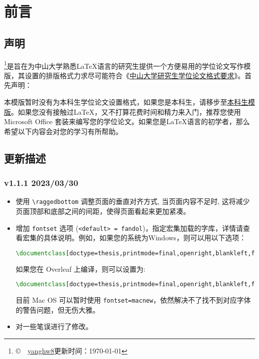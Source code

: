 \chapter{前\hspace*{1\ccwd}言}

\section{声明}

\sysuthesis{}\footnote{\copyright~\number\year~\href{https://github.com/yanghw8}{yanghw8}\hspace*{2\ccwd}更新时间：\today}是旨在为中山大学熟悉\LaTeX{}语言的研究生提供一个方便易用的学位论文写作模版，其设置的排版格式力求尽可能符合《\href{https://graduate.sysu.edu.cn/sites/graduate.prod.dpcms4.sysu.edu.cn/files/2019-04/%E4%B8%AD%E5%B1%B1%E5%A4%A7%E5%AD%A6%E7%A0%94%E7%A9%B6%E7%94%9F%E5%AD%A6%E4%BD%8D%E8%AE%BA%E6%96%87%E6%A0%BC%E5%BC%8F%E8%A6%81%E6%B1%82.pdf}{中山大学研究生学位论文格式要求}》。首先声明：

本模版暂时没有为本科生学位论文设置格式，如果您是本科生，请移步至\href{https://github.com/SYSU-SCC/sysu-thesis}{本科生模版}。如果您没有接触过\LaTeX{}，又不打算花费时间和精力来入门，推荐您使用 Microsoft Office 套装来编写您的学位论文。如果您是\LaTeX{}语言的初学者，那么希望以下内容会对您的学习有所帮助。

\section{更新描述}

\subsection*{v1.1.1 2023/03/30}
\begin{itemize}
    \item 使用 \texttt{\textbackslash raggedbottom} 调整页面的垂直对齐方式, 当页面内容不足时, 这将减少页面顶部和底部之间的间距，使得页面看起来更加紧凑。
    \item 增加 \texttt{fontset} 选项 (\texttt{<default> = fandol})，指定\CTeX{}宏集加载的字库，详情请查看\CTeX{}宏集的具体说明。例如，如果您的系统为Windows，则可以用以下选项：
\begin{lstlisting}[language=TeX]
\documentclass[doctype=thesis,printmode=final,openright,blankleft,fontset=windows]{sysuthesis}
\end{lstlisting}
    如果您在 Overleaf 上编译，则可以设置为:
\begin{lstlisting}[language=TeX]
\documentclass[doctype=thesis,printmode=final,openright,blankleft,fontset=ubuntu]{sysuthesis}
\end{lstlisting}
    目前 Mac OS 可以暂时使用 \texttt{fontset=macnew}，依然解决不了找不到对应字体的警告问题，但无伤大雅。
    \item 对一些笔误进行了修改。
\end{itemize}

